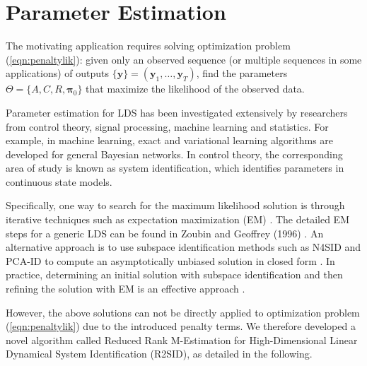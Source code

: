 \documentclass[fleqn]{article}
\let\oldref\ref
\renewcommand{\ref}[1]{(\oldref{#1})}
\begin{document}
\section{Parameter Estimation}
The motivating application requires solving optimization problem \ref{eqn:penaltylik}: given only an observed sequence (or multiple sequences in some applications) of outputs $\{\mathbf{y}\}=(\mathbf{y}_1,\ldots,\mathbf{y}_T)$, find the parameters $\Theta=\{A,C,R,\mathbf{\pi}_0\}$ that maximize the likelihood of the observed data.

Parameter estimation for LDS has been investigated extensively by researchers from control theory, signal processing, machine learning and statistics. For example, in machine learning, exact and variational learning algorithms are developed for general Bayesian networks. In control theory, the corresponding area of study is known as system identification, which identifies parameters in continuous state models.

Specifically, one way to search for the maximum likelihood solution is through iterative techniques such as expectation maximization (EM) \cite{shumway1982approach}. The detailed EM steps for a generic LDS can be found in Zoubin and Geoffrey (1996) \cite{ghahramani1996parameter}. An alternative approach is to use subspace identification methods such as N4SID and PCA-ID to compute an asymptotically unbiased solution in closed form \cite{van1994n4sid} \cite{doretto2003dynamic}. In practice, determining an initial solution with subspace identification and then refining the solution with EM is an effective approach \cite{bootslearning}.

However, the above solutions can not be directly applied to optimization problem \ref{eqn:penaltylik} due to the introduced penalty terms. We therefore developed a novel algorithm called Reduced Rank M-Estimation for High-Dimensional Linear Dynamical System Identification (R2SID), as detailed in the following.
\end{document}
